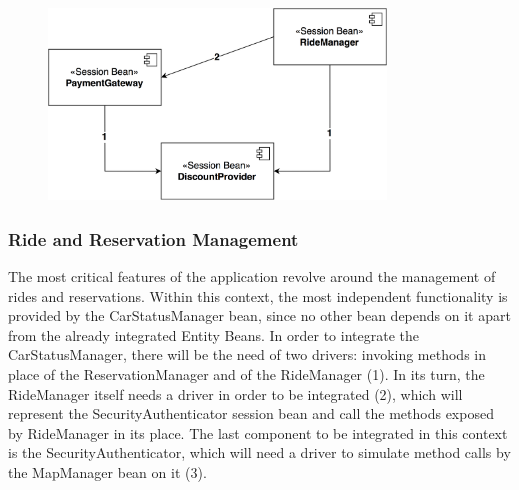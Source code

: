 \begin{figure}[H]
\begin{center}
		\includegraphics[width=0.8\textwidth]{./integration_strategy/diagrams/payment.png}
\end{center}
\end{figure}

\subsubsection{Ride and Reservation Management}
The most critical features of the application revolve around the management of rides and reservations. Within this context, the most independent functionality is provided by the CarStatusManager bean, since no other bean depends on it apart from the already integrated Entity Beans. In order to integrate the CarStatusManager, there will be the need of two drivers: invoking methods in place of the ReservationManager and of the RideManager (1).
\noindent
In its turn, the RideManager itself needs a driver in order to be integrated (2), which will represent the SecurityAuthenticator session bean and call the methods exposed by RideManager in its place.
\noindent
The last component to be integrated in this context is the SecurityAuthenticator, which will need a driver to simulate method calls by the MapManager bean on it (3).

